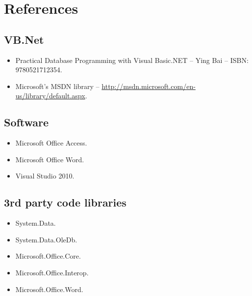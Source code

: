 \chapter{References}

\section{VB.Net}

\begin{itemize}
	\item{Practical Database Programming with Visual Basic.NET -- Ying
Bai -- ISBN: 9780521712354.}
	\item{Microsoft's MSDN library --
\url{http://msdn.microsoft.com/en-us/library/default.aspx}.}
\end{itemize}

\section{Software}

\begin{itemize}
	\item{Microsoft Office Access.}
	\item{Microsoft Office Word.}
	\item{Visual Studio 2010.}
\end{itemize}

\section{3rd party code libraries}

\begin{itemize}
	\item{System.Data.}
	\item{System.Data.OleDb.}
	\item{Microsoft.Office.Core.}
	\item{Microsoft.Office.Interop.}
	\item{Microsoft.Office.Word.}
\end{itemize}

